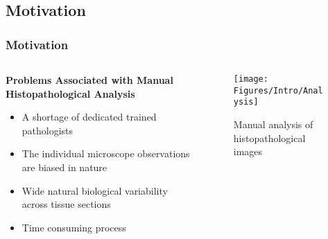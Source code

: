 \documentclass [9pt,times] {beamer}
\begin{document}
\subsection*{Motivation}\label{Motivation}
\begin{frame}\frametitle{Motivation}
\begin{columns}
	\begin{column}{5.6cm}
		\fontsize{5pt}{7pt}\selectfont
		\begin{block}{\textbf{Problems Associated with Manual Histopathological Analysis \cite{gurcan2009, Ong1996}}}
				\begin{block}{}
					\begin{itemize}
					\fontsize{6pt}{8pt}\selectfont
						\item A shortage of dedicated trained pathologists\\[.20cm]
						\item The individual microscope observations are biased in nature\\[.20cm]
						\item Wide natural biological variability across tissue sections\\[.20cm]
						\item Time consuming process\\[.20cm]
				\end{itemize}
				\end{block}
	\end{block}	
	\end{column}

\begin{column}{6cm}
\begin{figure}\label{fig:ph}
	\centering
	\texttt{[image: Figures/Intro/Analysis]}
	\caption{Manual analysis of histopathological images \cite{abcd}} 
\end{figure}
\end{column}
\end{columns}


\end{frame}
\end{document}
